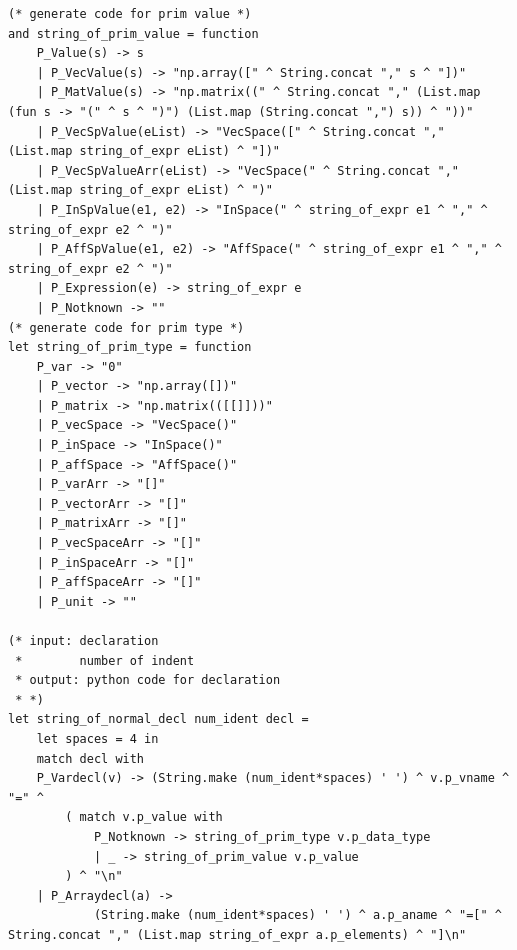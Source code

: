 \documentclass[12pt]{article} %
\begin{document}
\begin{lstlisting}[style=appendix, caption=compile.ml]
(* generate code for prim value *)
and string_of_prim_value = function
    P_Value(s) -> s
    | P_VecValue(s) -> "np.array([" ^ String.concat "," s ^ "])"
    | P_MatValue(s) -> "np.matrix((" ^ String.concat "," (List.map (fun s -> "(" ^ s ^ ")") (List.map (String.concat ",") s)) ^ "))"
    | P_VecSpValue(eList) -> "VecSpace([" ^ String.concat "," (List.map string_of_expr eList) ^ "])"    
    | P_VecSpValueArr(eList) -> "VecSpace(" ^ String.concat "," (List.map string_of_expr eList) ^ ")" 
    | P_InSpValue(e1, e2) -> "InSpace(" ^ string_of_expr e1 ^ "," ^ string_of_expr e2 ^ ")"            
    | P_AffSpValue(e1, e2) -> "AffSpace(" ^ string_of_expr e1 ^ "," ^ string_of_expr e2 ^ ")"      
    | P_Expression(e) -> string_of_expr e
    | P_Notknown -> ""   
(* generate code for prim type *)
let string_of_prim_type = function
    P_var -> "0"
    | P_vector -> "np.array([])"
    | P_matrix -> "np.matrix(([[]]))"
    | P_vecSpace -> "VecSpace()"
    | P_inSpace -> "InSpace()"
    | P_affSpace -> "AffSpace()"
    | P_varArr -> "[]"
    | P_vectorArr -> "[]"
    | P_matrixArr -> "[]"
    | P_vecSpaceArr -> "[]"
    | P_inSpaceArr -> "[]"
    | P_affSpaceArr -> "[]"
    | P_unit -> ""

(* input: declaration
 *        number of indent
 * output: python code for declaration
 * *)
let string_of_normal_decl num_ident decl = 
    let spaces = 4 in
    match decl with
    P_Vardecl(v) -> (String.make (num_ident*spaces) ' ') ^ v.p_vname ^ "=" ^ 
        ( match v.p_value with
            P_Notknown -> string_of_prim_type v.p_data_type
            | _ -> string_of_prim_value v.p_value
        ) ^ "\n"
    | P_Arraydecl(a) -> 
            (String.make (num_ident*spaces) ' ') ^ a.p_aname ^ "=[" ^ String.concat "," (List.map string_of_expr a.p_elements) ^ "]\n"


\end{lstlisting}
\end{document}
